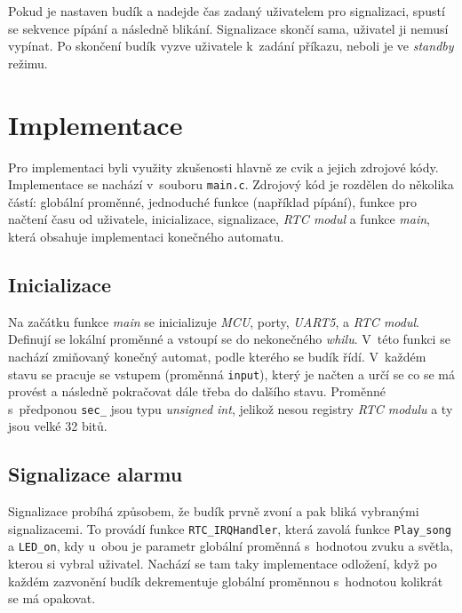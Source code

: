 \documentclass[11pt,a4paper]{article}
\begin{document}
Pokud je nastaven budík a nadejde čas zadaný uživatelem pro signalizaci, spustí se sekvence pípání a následně blikání. Signalizace skončí sama, uživatel ji nemusí vypínat. Po skončení budík vyzve uživatele k~zadání příkazu, neboli je ve \emph{standby} režimu.

\section{Implementace}
Pro implementaci byli využity zkušenosti hlavně ze cvik a jejich zdrojové kódy. Implementace se nachází v~souboru \verb|main.c|. Zdrojový kód je rozdělen do několika částí: globální proměnné, jednoduché funkce (například pípání), funkce pro načtení času od uživatele, inicializace, signalizace, \emph{RTC modul} a funkce \emph{main}, která obsahuje implementaci konečného automatu.

\subsection{Inicializace}
Na začátku funkce \emph{main} se inicializuje \emph{MCU}, porty, \emph{UART5}, a \emph{RTC modul}. Definují se lokální proměnné a vstoupí se do nekonečného \emph{whilu}. V~této funkci se nachází zmiňovaný konečný automat, podle kterého se budík řídí. V~každém stavu se pracuje se vstupem (proměnná \verb|input|), který je načten a určí se co se má provést a následně pokračovat dále třeba do dalšího stavu. Proměnné s~předponou \verb|sec_| jsou typu \emph{unsigned int}, jelikož nesou registry \emph{RTC modulu} a ty jsou velké 32 bitů.

\subsection{Signalizace alarmu}
Signalizace probíhá způsobem, že budík prvně zvoní a pak bliká vybranými signalizacemi. To provádí funkce \verb|RTC_IRQHandler|, která zavolá funkce \verb|Play_song| a \verb|LED_on|, kdy u~obou je parametr globální proměnná s~hodnotou zvuku a světla, kterou si vybral uživatel. Nachází se tam taky implementace odložení, když po každém zazvonění budík dekrementuje globální proměnnou s~hodnotou kolikrát se má opakovat.
\end{document}
